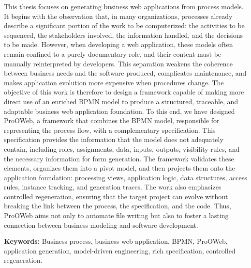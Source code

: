 \let\oldprintchaptertitle=\printchaptertitle
\renewcommand{\printchaptertitle}[1]{%
	\vspace*{-75pt}
	\oldprintchaptertitle{#1}
}%
\let\printchaptertitle=\oldprintchaptertitle


This thesis focuses on generating business web applications from process models. It begins with the observation that, in many organizations, processes already describe a significant portion of the work to be computerized: the activities to be sequenced, the stakeholders involved, the information handled, and the decisions to be made. However, when developing a web application, these models often remain confined to a purely documentary role, and their content must be manually reinterpreted by developers. This separation weakens the coherence between business needs and the software produced, complicates maintenance, and makes application evolution more expensive when procedures change. The objective of this work is therefore to design a framework capable of making more direct use of an enriched BPMN model to produce a structured, traceable, and adaptable business web application foundation. To this end, we have designed ProOWeb, a framework that combines the BPMN model, responsible for representing the process flow, with a complementary specification. This specification provides the information that the model does not adequately contain, including roles, assignments, data, inputs, outputs, visibility rules, and the necessary information for form generation. The framework validates these elements, organizes them into a pivot model, and then projects them onto the application foundation: processing views, application logic, data structures, access rules, instance tracking, and generation traces. The work also emphasizes controlled regeneration, ensuring that the target project can evolve without breaking the link between the process, the specification, and the code. Thus, ProOWeb aims not only to automate file writing but also to foster a lasting connection between business modeling and software development.

\vspace{1cm}
\noindent\textbf{Keywords:} Business process, business web application, BPMN, ProOWeb, application generation, model-driven engineering, rich specification, controlled regeneration.

\myCleanStarChapterEnd
